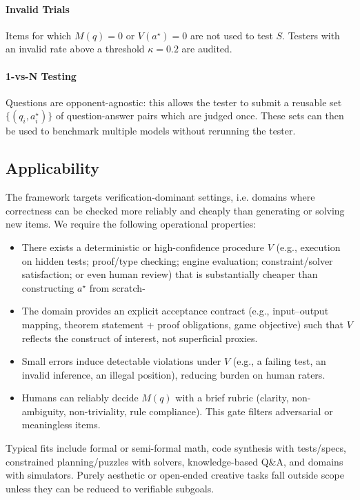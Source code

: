\documentclass{article} %
\begin{document}
\paragraph{Invalid Trials} Items for which $M(q) = 0$ or $V(a^\star) = 0$ are not used to test $S$. %
Testers with an invalid rate above a threshold $\kappa = 0.2$ are audited.

\paragraph{1-vs-N Testing} Questions are opponent-agnostic: this allows the tester to submit a reusable set $\{(q_i, a^\star_i)\}$ of question-answer pairs which are judged once. These sets can then be used to benchmark multiple models without rerunning the tester.

\subsection{Applicability}

The framework targets verification-dominant settings, i.e. domains where correctness can be checked more reliably and cheaply than generating or solving new items. We require the following operational properties:
\begin{itemize}
    \item There exists a deterministic or high-confidence procedure $V$ (e.g., execution on hidden tests; proof/type checking; engine evaluation; constraint/solver satisfaction; or even human review) that is substantially cheaper than constructing $a^\star$ from scratch-
    \item The domain provides an explicit acceptance contract (e.g., input–output mapping, theorem statement + proof obligations, game objective) such that $V$ reflects the construct of interest, not superficial proxies.
    \item Small errors induce detectable violations under $V$ (e.g., a failing test, an invalid inference, an illegal position), reducing burden on human raters.
    \item  Humans can reliably decide $M(q)$ with a brief rubric (clarity, non-ambiguity, non-triviality, rule compliance). This gate filters adversarial or meaningless items.
\end{itemize}

Typical fits include formal or semi-formal math, code synthesis with tests/specs, constrained planning/puzzles with solvers, knowledge-based Q\&A, and domains with simulators. Purely aesthetic or open-ended creative tasks fall outside scope unless they can be reduced to verifiable subgoals.
\end{document}
